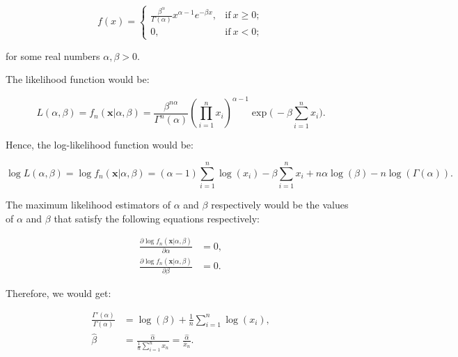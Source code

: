 \documentclass[11pt,fancychapters]{article}
\begin{document}
\begin{equation}\label{eqn1b1}
    f(x) = {\begin{cases}{\frac {\beta^\alpha}{\Gamma(\alpha)} x^{\alpha - 1} e^{-\beta x},}&\mathrm{if} \ x \geq 0;\\[8pt]0,&\mathrm{if} \ x < 0;\end{cases}}
\end{equation}

for some real numbers $\alpha, \beta > 0$.\newline

The likelihood function would be:

\begin{equation}\label{eqn1b2}
    L(\alpha, \beta) = f_n(\boldsymbol{x}|\alpha, \beta) = \frac {\beta^{n\alpha}}{\Gamma^n(\alpha)} \left( \prod_{i=1}^n x_i \right)^{\alpha - 1} \exp\biggl(\, -\beta \sum_{i=1}^{n} x_i \biggr).
\end{equation}

Hence, the log-likelihood function would be:

\begin{equation}\label{eqn1b3}
   \log{ L(\alpha, \beta)} = \log{f_n(\boldsymbol{x}|\alpha, \beta)} = (\alpha-1) \sum_{i=1}^n \log(x_i) - \beta \sum_{i=1}^{n}x_i + n\alpha \log{(\beta)} - n\log{(\Gamma(\alpha))}.
\end{equation}

The maximum likelihood estimators of $\alpha$ and $\beta$ respectively would be the values of $\alpha$ and $\beta$ that satisfy the following equations respectively:

\begin{equation}\label{eqn1b4}
\begin{split}
    \frac{\partial \log{f_n(\boldsymbol{x}|\alpha, \beta)}}{\partial \alpha} & = 0, \\
    \frac{\partial \log{f_n(\boldsymbol{x}|\alpha, \beta)}}{\partial \beta} & = 0.
\end{split}
\end{equation}

Therefore, we would get:

\begin{equation}\label{eqn1b5}
\begin{split}
    \frac{\Gamma'(\alpha)}{\Gamma(\alpha)} & = \log{(\beta)} + \frac{1}{n} \sum_{i=1}^n \log{(x_i)}, \\
    \widehat{\beta} & = \frac{\widehat{\alpha}}{\frac{1}{n} \sum_{i=1}^n x_n} = \frac{\widehat{\alpha}}{\overline{x}_n}.
\end{split}
\end{equation}
\end{document}
